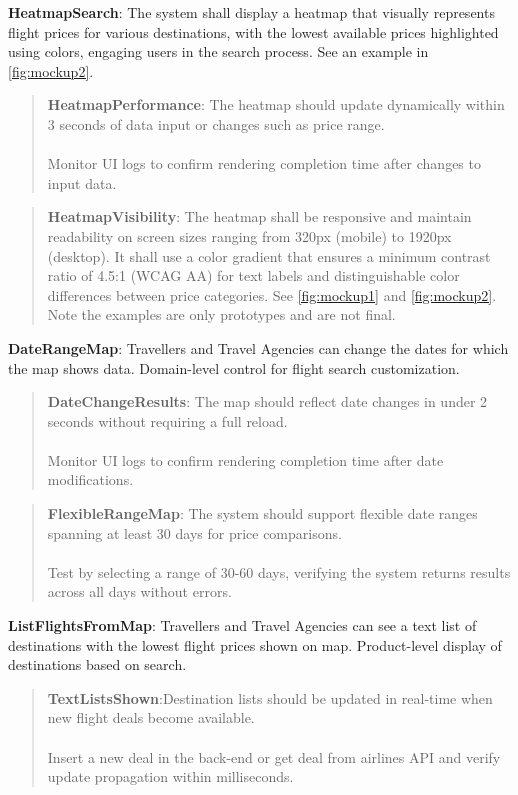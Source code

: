 \textbf{HeatmapSearch}: The system shall display a heatmap that visually represents flight prices for various destinations, with the lowest available prices highlighted using colors, engaging users in the search process. See an example in \autoref{fig:mockup2}.
    \begin{quote}
        \textbf{HeatmapPerformance}: The heatmap should update dynamically within 3 seconds of data input or changes such as price range. \\ \\
        Monitor UI logs to confirm rendering completion time after changes to input data.
    \end{quote}
    \begin{quote}
        \textbf{HeatmapVisibility}: The heatmap shall be responsive and maintain readability on screen sizes ranging from 320px (mobile) to 1920px (desktop). It shall use a color gradient that ensures a minimum contrast ratio of 4.5:1 (WCAG AA) for text labels and distinguishable color differences between price categories. See \autoref{fig:mockup1} and \autoref{fig:mockup2}. Note the examples are only prototypes and are not final.
    \end{quote}
\textbf{DateRangeMap}: Travellers and Travel Agencies can change the dates for which the map shows data. Domain-level control for flight search customization.
    \begin{quote}
        \textbf{DateChangeResults}: The map should reflect date changes in under 2 seconds without requiring a full reload. \\ \\
        Monitor UI logs to confirm rendering completion time after date modifications.
    \end{quote}
\begin{quote}
    \textbf{FlexibleRangeMap}: The system should support flexible date ranges spanning at least 30 days for price comparisons. \\ \\
    Test by selecting a range of 30-60 days, verifying the system returns results across all days without errors.
\end{quote}
\textbf{ListFlightsFromMap}: Travellers and Travel Agencies can see a text list of destinations with the lowest flight prices shown on map. Product-level display of destinations based on search.
    \begin{quote}
        \textbf{TextListsShown}:Destination lists should be updated in real-time when new flight deals become available. \\ \\
        Insert a new deal in the back-end or get deal from airlines API and verify update propagation within milliseconds.
    \end{quote}
